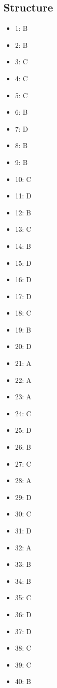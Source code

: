 \documentclass[12pt]{article}
\begin{document}
\subsection*{Structure}
\begin{itemize}[leftmargin=*]
\item 1: B
\item 2: B
\item 3: C
\item 4: C
\item 5: C
\item 6: B
\item 7: D
\item 8: B
\item 9: B
\item 10: C
\item 11: D
\item 12: B
\item 13: C
\item 14: B
\item 15: D
\item 16: D
\item 17: D
\item 18: C
\item 19: B
\item 20: D
\item 21: A
\item 22: A
\item 23: A
\item 24: C
\item 25: D
\item 26: B
\item 27: C
\item 28: A
\item 29: D
\item 30: C
\item 31: D
\item 32: A
\item 33: B
\item 34: B
\item 35: C
\item 36: D
\item 37: D
\item 38: C
\item 39: C
\item 40: B
\end{itemize}
\end{document}
